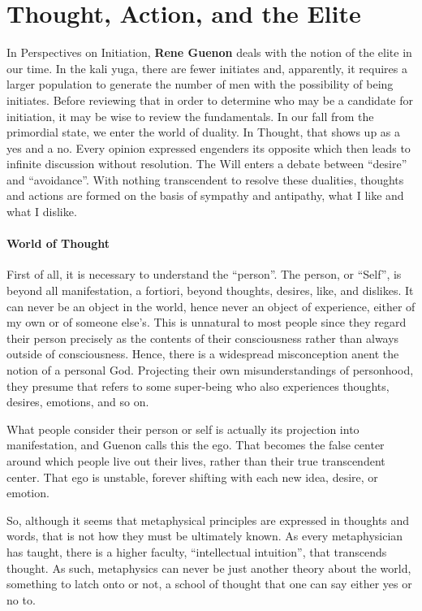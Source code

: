 \section{Thought, Action, and the Elite}

In Perspectives on Initiation, \textbf{Rene Guenon} deals with the notion of the elite in our time. In the kali yuga, there are fewer initiates and, apparently, it requires a larger population to generate the number of men with the possibility of being initiates. Before reviewing that in order to determine who may be a candidate for initiation, it may be wise to review the fundamentals. In our fall from the primordial state, we enter the world of duality. In Thought, that shows up as a yes and a no. Every opinion expressed engenders its opposite which then leads to infinite discussion without resolution. The Will enters a debate between ``desire'' and ``avoidance''. With nothing transcendent to resolve these dualities, thoughts and actions are formed on the basis of sympathy and antipathy, what I like and what I dislike.

\paragraph{World of Thought}


First of all, it is necessary to understand the ``person''. The person, or ``Self'', is beyond all manifestation, a fortiori, beyond thoughts, desires, like, and dislikes. It can never be an object in the world, hence never an object of experience, either of my own or of someone else's. This is unnatural to most people since they regard their person precisely as the contents of their consciousness rather than always outside of consciousness. Hence, there is a widespread misconception anent the notion of a personal God. Projecting their own misunderstandings of personhood, they presume that refers to some super-being who also experiences thoughts, desires, emotions, and so on.

What people consider their person or self is actually its projection into manifestation, and Guenon calls this the ego. That becomes the false center around which people live out their lives, rather than their true transcendent center. That ego is unstable, forever shifting with each new idea, desire, or emotion.

So, although it seems that metaphysical principles are expressed in thoughts and words, that is not how they must be ultimately known. As every metaphysician has taught, there is a higher faculty, ``intellectual intuition'', that transcends thought. As such, metaphysics can never be just another theory about the world, something to latch onto or not, a school of thought that one can say either yes or no to.


